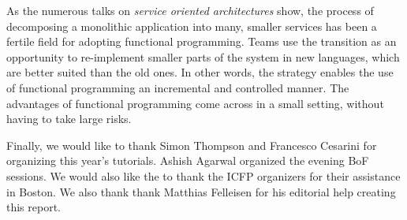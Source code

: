 \documentclass{jfp1}
\begin{document}
As the numerous talks on \textit{service oriented architectures} show, the
process of decomposing a monolithic application into many, smaller services
has been a fertile field for adopting functional programming. Teams use the
transition as an opportunity to re-implement smaller parts of the system in
new languages, which are better suited than the old ones. In other words,
the strategy enables the use of functional programming an incremental and
controlled manner. The advantages of functional programming come across in
a small setting, without having to take large risks.

Finally, we would like to thank Simon Thompson and Francesco Cesarini
for organizing this year's tutorials. Ashish Agarwal organized the
evening BoF sessions. We would also like the to thank the ICFP
organizers for their assistance in Boston. We also thank thank
Matthias Felleisen for his editorial help creating this report.


\end{document}

